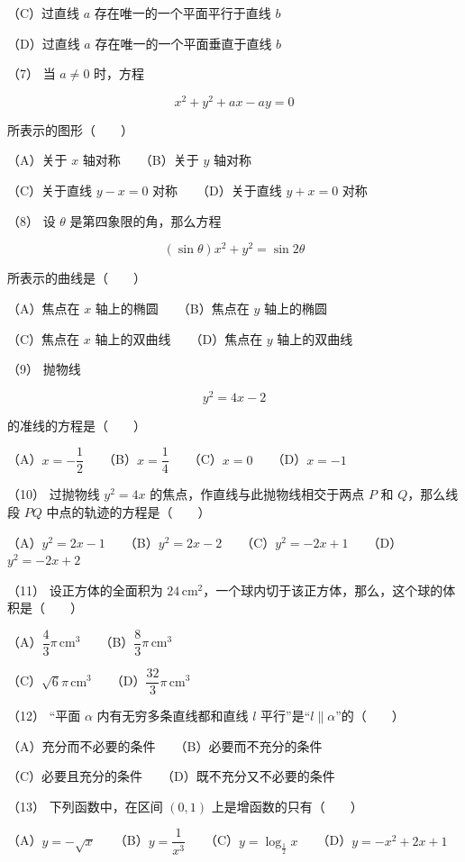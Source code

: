 \begin{answer}
（C）过直线 $a$ 存在唯一的一个平面平行于直线 $b$

（D）过直线 $a$ 存在唯一的一个平面垂直于直线 $b$

（7） 当 $a\ne0$ 时，方程

\nopagebreak[4]
\[
x^2+y^2+ax-ay=0
\]

所表示的图形\mbox{（　　）}

（A）关于 $x$ 轴对称　　（B）关于 $y$ 轴对称

（C）关于直线 $y-x=0$ 对称　　（D）关于直线 $y+x=0$ 对称

（8） 设 $\theta$ 是第四象限的角，那么方程

\nopagebreak[4]
\[
(\sin\theta)x^2+y^2=\sin2\theta
\]

所表示的曲线是\mbox{（　　）}

（A）焦点在 $x$ 轴上的椭圆　　（B）焦点在 $y$ 轴上的椭圆

（C）焦点在 $x$ 轴上的双曲线　　（D）焦点在 $y$ 轴上的双曲线

（9） 抛物线

\nopagebreak[4]
\[
y^2=4x-2
\]

的准线的方程是\mbox{（　　）}

（A）$x=-\dfrac12$　　（B）$x=\dfrac14$　　（C）$x=0$　　（D）$x=-1$

（10） 过抛物线 $y^2=4x$ 的焦点，作直线与此抛物线相交于两点 $P$ 和 $Q$，那么线段 $PQ$ 中点的轨迹的方程是\mbox{（　　）}

（A）$y^2=2x-1$　　（B）$y^2=2x-2$　　（C）$y^2=-2x+1$　　（D）$y^2=-2x+2$

（11） 设正方体的全面积为 $24\,\mathrm{cm}^2$，一个球内切于该正方体，那么，这个球的体积是\mbox{（　　）}

（A）$\dfrac43\pi\,\mathrm{cm}^3$　　（B）$\dfrac83\pi\,\mathrm{cm}^3$

（C）$\sqrt6\pi\,\mathrm{cm}^3$　　（D）$\dfrac{32}3\pi\,\mathrm{cm}^3$

（12） “平面 $\alpha$ 内有无穷多条直线都和直线 $l$ 平行”是“$l\parallel\alpha$”的\mbox{（　　）}

（A）充分而不必要的条件　　（B）必要而不充分的条件

（C）必要且充分的条件　　（D）既不充分又不必要的条件

（13） 下列函数中，在区间 $(0,1)$ 上是增函数的只有\mbox{（　　）}

（A）$y=-\sqrt{x}$　　（B）$y=\dfrac1{x^3}$　　（C）$y=\log_{\frac12}x$　　（D）$y=-x^2+2x+1$


\end{answer}

